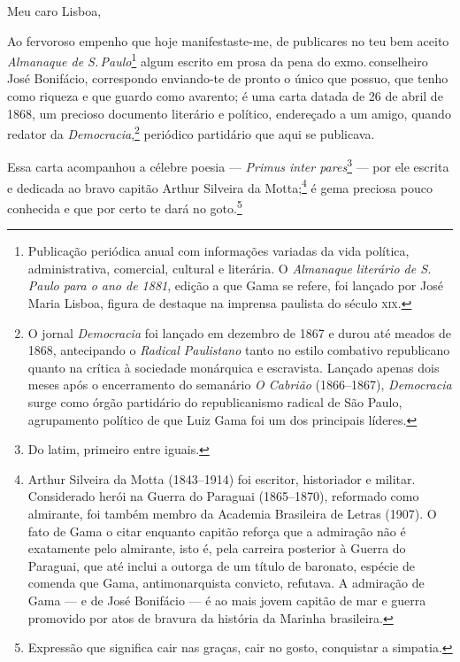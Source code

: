 Meu caro Lisboa,

Ao fervoroso empenho que hoje manifestaste-me, de publicares no teu bem
aceito \emph{Almanaque de S.\,Paulo}\footnote{Publicação periódica anual
  com informações variadas da vida política, administrativa, comercial,
  cultural e literária. O \emph{Almanaque literário de S.\,Paulo para o
  ano de 1881}, edição a que Gama se refere, foi lançado por José Maria
  Lisboa, figura de destaque na imprensa paulista do século \textsc{xix}.} algum
escrito em prosa da pena do exmo.\,conselheiro José Bonifácio,
correspondo enviando-te de pronto o único que possuo, que tenho como
riqueza e que guardo como avarento; é uma carta datada de 26 de abril de
1868, um precioso documento literário e político, endereçado a um amigo,
quando redator da \emph{Democracia},\footnote{O jornal
  \emph{Democracia} foi lançado em dezembro de 1867 e durou até meados
  de 1868, antecipando o \emph{Radical Paulistano} tanto no estilo
  combativo republicano quanto na crítica à sociedade monárquica e
  escravista. Lançado apenas dois meses após o encerramento do semanário
  \emph{O Cabrião} (1866--1867), \emph{Democracia} surge como órgão
  partidário do republicanismo radical de São Paulo, agrupamento
  político de que Luiz Gama foi um dos principais líderes.} periódico
partidário que aqui se publicava.

Essa carta acompanhou a célebre poesia --- \textit{Primus inter pares}\footnote{
  Do latim, primeiro entre iguais.} --- por ele escrita e dedicada ao
bravo capitão Arthur Silveira da Motta;\footnote{Arthur Silveira da
  Motta (1843--1914) foi escritor, historiador e militar. Considerado
  herói na Guerra do Paraguai (1865--1870), reformado como almirante, foi
  também membro da Academia Brasileira de Letras (1907). O fato de Gama
  o citar enquanto capitão reforça que a admiração não é exatamente pelo
  almirante, isto é, pela carreira posterior à Guerra do Paraguai, que
  até inclui a outorga de um título de baronato, espécie de comenda que
  Gama, antimonarquista convicto, refutava. A admiração de Gama --- e de
  José Bonifácio --- é ao mais jovem capitão de mar e guerra promovido
  por atos de bravura da história da Marinha brasileira.} é gema
preciosa pouco conhecida e que por certo te dará no goto.\footnote{
  Expressão que significa cair nas graças, cair no gosto, conquistar a
  simpatia.}\medskip{}



